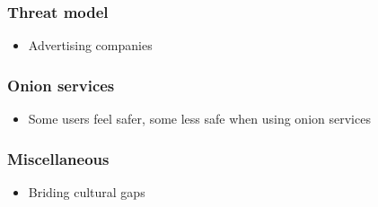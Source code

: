 \subsubsection{Threat model}

\begin{itemize}
    \item Advertising companies
\end{itemize}

\subsubsection{Onion services}

\begin{itemize}
    \item Some users feel safer, some less safe when using onion services
\end{itemize}

\subsubsection{Miscellaneous}

\begin{itemize}
    \item Briding cultural gaps
\end{itemize}
